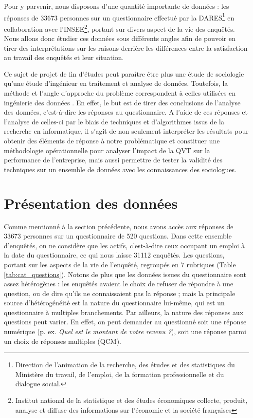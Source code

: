 \documentclass[11pt,fleqn,a4paper,openany,frenchb]{book} %
\begin{document}
Pour y parvenir, nous disposons d'une quantité importante de données : les réponses de 33673 personnes sur un questionnaire effectué par la DARES\footnote{Direction de l'animation de la recherche, des études et des statistiques du Ministère du travail, de l'emploi, de la formation professionnelle et du dialogue social.} en collaboration avec l'INSEE\footnote{Institut national de la statistique et des études économiques collecte, produit, analyse et diffuse des informations sur l'économie et la société françaises}, portant sur divers aspect de la vie des enquêtés. Nous allons donc étudier ces données sous différents angles afin de pouvoir en tirer des interprétations sur les raisons derrière les différences entre la satisfaction au travail des enquêtés et leur situation.\par

Ce sujet de projet de fin d'études peut paraître être plus une étude de sociologie qu'une étude d'ingénieur en traitement et analyse de données. Toutefois, la méthode et l'angle d'approche du problème correspondent à celles utilisées en ingénierie des données . En effet, le but est de tirer des conclusions de l'analyse des données, c'est-à-dire les réponses au questionnaire. A l'aide de ces réponses et l'analyse de celles-ci par le biais de techniques et d'algorithmes issus de la recherche en informatique, il s'agit de non seulement interpréter les résultats pour obtenir des éléments de réponse à notre problématique et constituer une  méthodologie opérationnelle pour analyser l'impact de la QVT sur la performance de l'entreprise, mais aussi permettre de tester la validité des techniques sur un ensemble de données avec les connaissances des sociologues.\par

\section{Présentation des données}

Comme mentionné à la section précédente, nous avons accès aux réponses de 33673 personnes sur un questionnaire de 520 questions. Dans cette ensemble d'enquêtés, on ne considère que les actifs, c'est-à-dire ceux occupant un emploi à la date du questionnaire, ce qui nous laisse 31112 enquêtés. Les questions, portant sur les aspects de la vie de l'enquêté, regroupés en 7 rubriques (Table \ref{tab:cat_questions}). Notons de plus que les données issues du questionnaire sont assez hétérogènes : les enquêtés avaient le choix de refuser de répondre à une question, ou de dire qu'ils ne connaissaient pas la réponse ; mais la principale source d'hétérogénéité est la nature du questionnaire lui-même, qui est un questionnaire à multiples branchements. Par ailleurs, la nature des réponses aux questions peut varier. En effet, on peut demander au questionné soit une réponse numérique (p. ex. \textit{Quel est le montant de votre revenu ?}), soit une réponse parmi un choix de réponses multiples (QCM).\par
\end{document}

